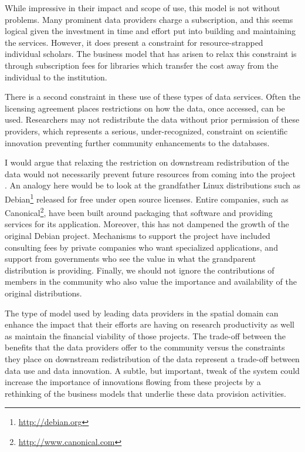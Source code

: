 \documentclass[11pt]{article}
\begin{document}
While impressive in their impact and scope of use, this model is not without
problems. Many prominent data providers charge a subscription, and this seems
logical given the investment in time and effort put into building and
maintaining the services. However, it does present a constraint for
resource-strapped individual scholars. The business model that has arisen to
relax this constraint is through subscription fees for libraries which transfer
the cost away from the individual to the institution.

There is a second constraint in these use of these types of data services.
Often the licensing agreement places restrictions on how the data, once
accessed, can be used. Researchers may not redistribute the data without prior
permission of these providers, which represents a serious, under-recognized,
constraint on scientific innovation preventing further community enhancements
to the databases.


I would argue that relaxing the restriction on downstream redistribution of the
data would not necessarily prevent future resources from coming into the project
\cite{rey_open_2014}. An analogy here would be to look at the grandfather Linux
distributions such as Debian\footnote{\url{http://debian.org}} released for free
under open source licenses. Entire companies, such as
Canonical\footnote{\url{http://www.canonical.com}}, have been built around
packaging that software and providing services for its application. Moreover,
this has not dampened the growth of the original Debian project. Mechanisms to
support the project have included consulting fees by private companies who want
specialized applications, and support from governments who see the value in what
the grandparent distribution is providing. Finally, we should not ignore the
contributions of members in the community who also value the importance and
availability of the original distributions.


The type of model used by leading data providers in the spatial domain can
enhance the impact that their efforts are having on research productivity as
well as maintain the financial viability of those projects. The trade-off
between the benefits that the data providers offer to the community versus
the constraints they place on downstream redistribution of the data represent a
trade-off between data use and data innovation. A subtle, but important, tweak of
the system could increase the importance of innovations flowing from these
projects by a rethinking of the business models that underlie these data 
provision activities.
\end{document}
